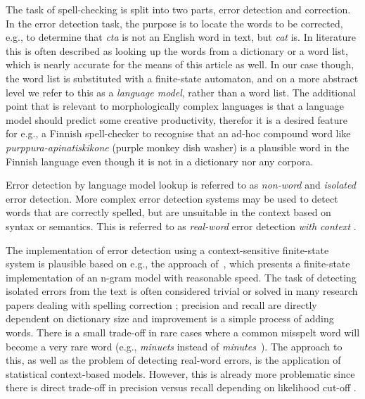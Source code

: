 \documentclass[a4paper,12pt]{article}
\begin{document}
The task of spell-checking is split into two parts, error detection and
correction. In the error detection task, the purpose is to locate the words to
be corrected, e.g., to determine that \emph{cta} is not an English word in text, 
but \emph{cat} is. In literature this is often described as looking up the
words from a dictionary or a word list, which is nearly accurate for the means
of this article as well. In our case though, the word list is substituted with
a finite-state automaton, and on a more abstract level we refer to this as a
\emph{language model}, rather than a word list. The additional point that is
relevant to morphologically complex languages is that a language model should
predict some creative productivity, therefor it is a desired feature for e.g.,
a Finnish spell-checker to recognise that an ad-hoc compound word like
\emph{purppura-apinatiskikone} (purple monkey dish washer) is a plausible word
in the Finnish language even though it is not in a dictionary nor any corpora.

Error detection by language model lookup is referred to as \emph{non-word} and
\emph{isolated} error detection. More complex error detection systems may be
used to detect words that are correctly spelled, but are unsuitable in the
context based on syntax or semantics. This is referred to as \emph{real-word}
error detection \emph{with context} \cite[]{mays/1991}.

The implementation of error detection using a context-sensitive finite-state
system is plausible based on e.g., the approach of~\cite{silfverberg/2010},
which presents a finite-state implementation of an n-gram model with reasonable
speed. The task of detecting isolated errors from the text is often considered
trivial or solved in many research papers dealing with spelling correction
\cite[e.g.][]{otero/2007}; precision and recall are directly dependent on
dictionary size and improvement is a simple process of adding words. There is
a small trade-off in rare cases where a common misspelt word will become a very
rare word (e.g., \emph{minuets} instead of
\emph{minutes}~\cite[]{kukich1992techniques}). The approach to this, as well as
the problem of detecting real-word errors, is the application of statistical
context-based models. However, this is already more problematic since there is
direct trade-off in precision versus recall depending on likelihood cut-off
\cite[]{hirst2008evaluation,wilcoxohearn2008realword}.
\end{document}
